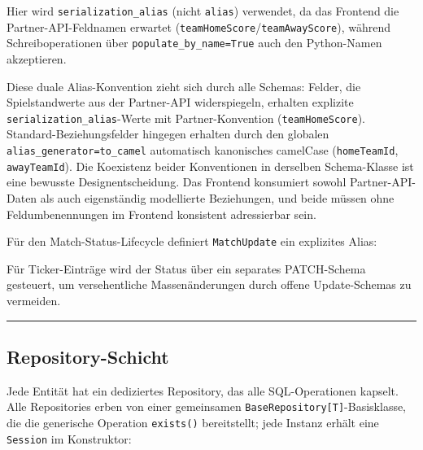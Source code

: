 Hier wird \texttt{serialization\_alias} (nicht \texttt{alias})
verwendet, da das Frontend die Partner-API-Feldnamen erwartet
(\texttt{teamHomeScore}/\texttt{teamAwayScore}), während
Schreiboperationen über \texttt{populate\_by\_name=True} auch den
Python-Namen akzeptieren.

Diese duale Alias-Konvention zieht sich durch alle Schemas: Felder, die
Spielstandwerte aus der Partner-API widerspiegeln, erhalten explizite
\texttt{serialization\_alias}-Werte mit Partner-Konvention
(\texttt{teamHomeScore}). Standard-Beziehungsfelder hingegen erhalten
durch den globalen \texttt{alias\_generator=to\_camel} automatisch
kanonisches camelCase (\texttt{homeTeamId}, \texttt{awayTeamId}). Die
Koexistenz beider Konventionen in derselben Schema-Klasse ist eine
bewusste Designentscheidung. Das Frontend konsumiert sowohl
Partner-API-Daten als auch eigenständig modellierte Beziehungen, und
beide müssen ohne Feldumbenennungen im Frontend konsistent adressierbar
sein.

Für den Match-Status-Lifecycle definiert \texttt{MatchUpdate} ein
explizites Alias:

\begin{Shaded}
\begin{Highlighting}[]
\OperatorTok{=}\OperatorTok{=}\NormalTok{)}
\end{Highlighting}
\end{Shaded}

Für Ticker-Einträge wird der Status über ein separates PATCH-Schema
gesteuert, um versehentliche Massenänderungen durch offene
Update-Schemas zu vermeiden.

\begin{center}\rule{0.5\linewidth}{0.5pt}\end{center}

\subsection{Repository-Schicht}\label{repository-schicht}

Jede Entität hat ein dediziertes Repository, das alle SQL-Operationen
kapselt. Alle Repositories erben von einer gemeinsamen
\texttt{BaseRepository{[}T{]}}-Basisklasse, die die generische Operation
\texttt{exists()} bereitstellt; jede Instanz erhält eine
\texttt{Session} im Konstruktor:

